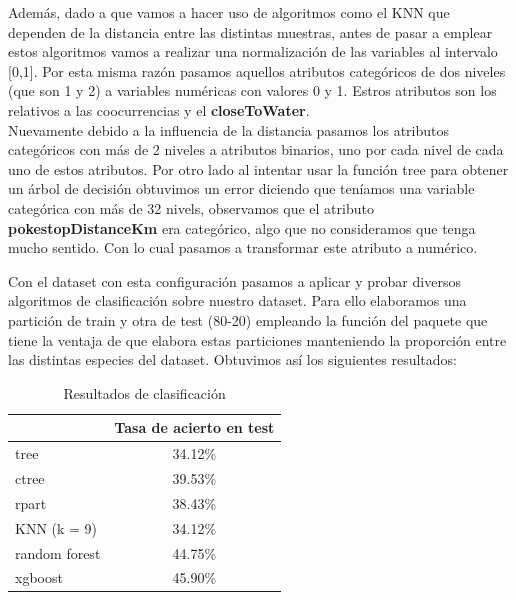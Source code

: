 Además, dado a que vamos a hacer uso de algoritmos como el KNN que dependen de la distancia entre las distintas muestras, antes de pasar a emplear estos algoritmos vamos a realizar una normalización de las variables al intervalo [0,1]. Por esta misma razón pasamos aquellos atributos categóricos de dos niveles (que son 1 y 2) a variables numéricas con valores 0 y 1. Estros atributos son los relativos a las coocurrencias y el \textbf{closeToWater}.\\

Nuevamente debido a la influencia de la distancia pasamos los atributos categóricos con más de 2 niveles  a atributos binarios, uno por cada nivel de cada uno de estos atributos. Por otro lado al intentar usar la función tree para obtener un árbol de decisión obtuvimos un error diciendo que teníamos una variable categórica con más de 32 nivels, observamos que el atributo \textbf{pokestopDistanceKm} era categórico, algo que no consideramos que tenga mucho sentido. Con lo cual pasamos a transformar este atributo a numérico. 

Con el dataset con esta configuración pasamos a aplicar y probar diversos algoritmos de clasificación sobre nuestro dataset. Para ello elaboramos una partición de train y otra de test (80-20) empleando la función  del paquete  que tiene la ventaja de que elabora estas particiones manteniendo la proporción entre las distintas especies del dataset. Obtuvimos así los siguientes resultados:

\begin{table}[H]
\centering
\caption{Resultados de clasificación}
\label{my-label}
\begin{tabular}{|l|c|}
\hline
\rowcolor[HTML]{FFFC9E} 
\multicolumn{1}{|c|}{\cellcolor[HTML]{FFFC9E}\textbf{Algoritmo}} & \textbf{Tasa de acierto en test} \\ \hline
tree                                                             & 34.12\%                          \\ \hline
ctree                                                            & 39.53\%                          \\ \hline
rpart                                                            & 38.43\%                          \\ \hline
KNN (k = 9)                                                      & 34.12\%                          \\ \hline
random forest                                                    & 44.75\%                          \\ \hline
xgboost                                                          & 45.90\%                          \\ \hline
\end{tabular}
\end{table}


